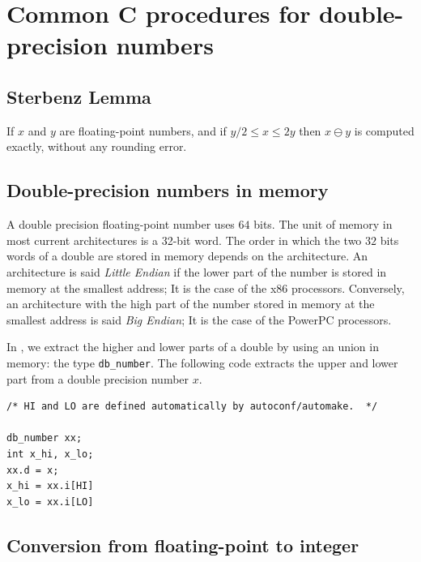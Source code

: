 \section{Common C procedures for double-precision numbers\label{section:commonCdouble}}

\subsection{Sterbenz Lemma \label{sec:sterbenz}}

\begin{theorem}
\label{sterbenz}
If $x$ and $y$ are floating-point numbers, and if ${y}/{2} \leq x \leq
2y$ then $x\ominus y$ is computed exactly, without any rounding error.
\end{theorem}


\subsection{Double-precision numbers in memory\label{section:memory}}

A double precision floating-point number uses $64$ bits. The unit of
memory in most current architectures is a 32-bit word. The order in
which the two $32$ bits words of a double are stored in memory depends
on the architecture. An architecture is said \emph{Little Endian} if
the lower part of the number is stored in memory at the smallest
address; It is the case of the x86 processors. Conversely, an
architecture with the high part of the number stored in memory at the
smallest address is said \emph{Big Endian}; It is the case of the
PowerPC processors.

In \crlibm, we extract the higher and lower parts of a double by using
an union in memory: the type \texttt{db\_number}. The following code
extracts the upper and lower part from a double precision number $x$.

\begin{lstlisting}[label={chap0:lst:endian},
  caption={Extract upper and lower part of a double precision number $x$},firstnumber=1]
  /* HI and LO are defined automatically by autoconf/automake.  */

db_number xx;
int x_hi, x_lo;
xx.d = x;
x_hi = xx.i[HI]
x_lo = xx.i[LO]
\end{lstlisting}




\subsection{Conversion from floating-point to integer \label{sec:double2int}}

